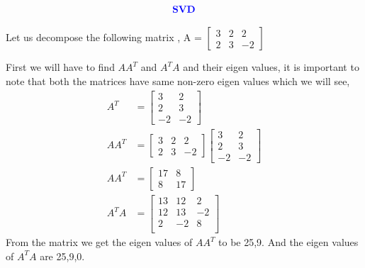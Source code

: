 \documentclass[12pt,a4paper]{article}
\begin{document}
{\section{}


\begin{align*}
   \textcolor{blue}{ \text{{\textbf{SVD}}}}
\end{align*}

Let us decompose the following matrix ,
A = $\begin{bmatrix}
                    3 & 2 & 2\\
                    2 & 3 & -2
                \end{bmatrix}$


First we will have to find $AA^T$ and $A^TA$ and their eigen values, it is important to note that both the matrices have same non-zero eigen values which we will see,
\begin{align*}
    A^T &= \begin{bmatrix}
                    3 & 2 \\
                    2 & 3 \\
                    -2 & -2
                \end{bmatrix} \\
    AA^T &= \begin{bmatrix}
                    3 & 2 & 2\\
                    2 & 3 & -2
                \end{bmatrix} 
            \begin{bmatrix}
                3 & 2 \\
                2 & 3 \\
                -2 & -2
            \end{bmatrix} \\
    AA^T &= \begin{bmatrix}
                    17 & 8 \\
                    8 & 17
                \end{bmatrix} \\
    A^TA &= \begin{bmatrix}
                    13 & 12 & 2 \\
                    12 & 13 & -2 \\
                    2 & -2 & 8 \\
                \end{bmatrix}
\end{align*}
From the matrix we get the eigen values of $AA^T$ to be 25,9.
And the eigen values of $A^TA$ are 25,9,0.


}
\end{document}
